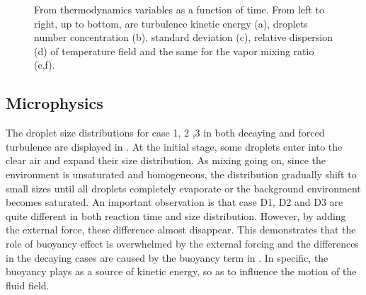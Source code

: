\begin{figure}[!htbp]\ContinuedFloat\centering
{}
\caption{From thermodynamics variables as a function of time. From left to right, 
up to bottom, are turbulence kinetic energy (a), droplets number 
concentration (b), standard deviation (c), relative dispersion (d) of 
temperature field and the same for the vapor mixing ratio (e,f).}\label{fig:therm_dynam} 
\end{figure}

\subsection{Microphysics}
The droplet size distributions for case 1, 2 ,3 in both decaying and forced
turbulence are displayed in . At the initial stage, some
droplets enter into the clear air and expand their size distribution. As mixing
going on, since the environment is unsaturated and homogeneous, the
distribution gradually shift to small sizes until all droplets completely
evaporate or the background environment becomes saturated.  An important
observation is that case D1, D2 and D3 are quite different in both reaction
time and size distribution. However, by adding the external force, these
difference almost disappear. This demonstrates that the role of buoyancy effect
is overwhelmed by the external forcing and the differences in the decaying
cases are caused by the buoyancy term in . In specific, the
buoyancy plays as a source of kinetic energy, so as to influence the motion of
the fluid field.  

